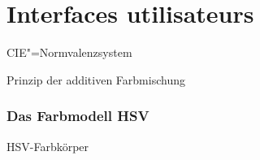 \documentclass[a4paper,12pt,abstracton,titlepage]{scrartcl}
\begin{document}
\section{Interfaces utilisateurs}






\begin{floatingfigure}[r]{6cm}
	\caption{CIE"=Normvalenzsystem}
	\label{cie}
\end{floatingfigure}



\begin{floatingfigure}[l]{5.3cm}
	\caption{Prinzip der additiven Farbmischung}
	\label{venn}
\end{floatingfigure}

\par



\vspace{2em}

\subsubsection{Das Farbmodell HSV}
\begin{floatingfigure}[r]{8.3cm}
	\caption{HSV-Farbkörper}
	\label{hsv}
\end{floatingfigure} 
\end{document}
